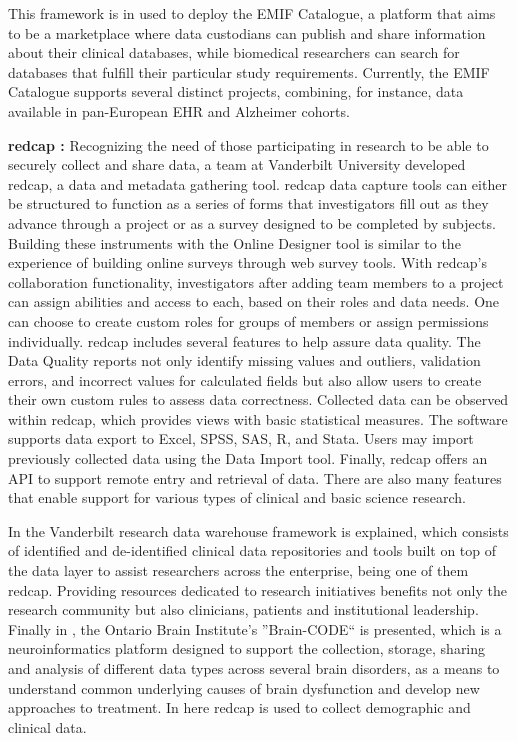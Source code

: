 This framework is in used to deploy the EMIF Catalogue, a platform that aims to be a
marketplace where data custodians can publish and share information about their
clinical databases, while biomedical researchers can search for databases that fulfill
their particular study requirements.
Currently, the EMIF Catalogue supports several distinct projects, combining, for
instance, data available in pan-European EHR and Alzheimer cohorts.

\textbf{\gls{redcap} \cite{redcap}:}
Recognizing the need of those participating in research to be able to securely collect
and share data, a team at Vanderbilt University developed \gls{redcap}, a data and
metadata gathering tool.
\gls{redcap} data capture tools can either be structured to function as a series of
forms that investigators fill out as they advance through a project or as a survey
designed to be completed by subjects.
Building these instruments with the Online Designer tool is similar to the experience
of building online surveys through web survey tools.
With \gls{redcap}'s collaboration functionality, investigators after adding team
members to a project can assign abilities and access to each, based on their roles and
data needs.
One can choose to create custom roles for groups of members or assign permissions
individually.  \gls{redcap} includes several features to help assure data quality.
The Data Quality reports not only identify missing values and outliers, validation
errors, and incorrect values for calculated fields but also allow users to create their
own custom rules to assess data correctness.
Collected data can be observed within \gls{redcap}, which provides views with basic
statistical measures.
The software supports data export to Excel, SPSS, SAS, R, and Stata.
Users may import previously collected data using the Data Import tool.
Finally, \gls{redcap} offers an API to support remote entry and retrieval of data.
There are also many features that enable support for various types of clinical and
basic science research.

In \cite{vanderbilt} the Vanderbilt research data warehouse framework is explained,
which consists of identified and de-identified clinical data repositories and tools
built on top of the data layer to assist researchers across the enterprise, being one
of them \gls{redcap}.
Providing resources dedicated to research initiatives benefits not only the research
community but also clinicians, patients and institutional leadership.
Finally in \cite{braincode}, the Ontario Brain Institute’s ''Brain-CODE`` is
presented, which is a neuroinformatics platform designed to support the collection,
storage, sharing and analysis of different data types across several brain disorders,
as a means to understand common underlying causes of brain dysfunction and develop new
approaches to treatment.
In here \gls{redcap} is used to collect demographic and clinical data.

